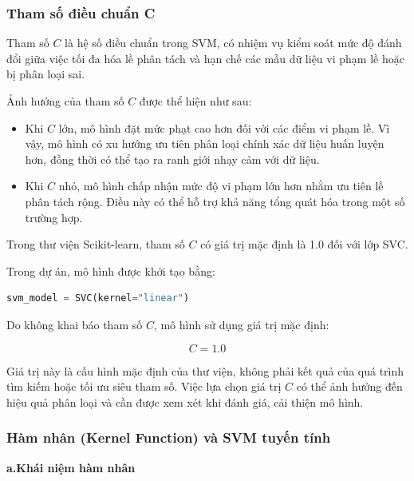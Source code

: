 \documentclass[14pt]{extarticle}
\begin{document}
		\subsubsection{Tham số điều chuẩn C}
		
		\noindent
		Tham số $C$ là hệ số điều chuẩn trong SVM, có nhiệm vụ kiểm soát mức độ đánh đổi giữa việc tối đa hóa lề phân tách và hạn chế các mẫu dữ liệu vi phạm lề hoặc bị phân loại sai.
		
		\noindent
		Ảnh hưởng của tham số $C$ được thể hiện như sau:
		
		\begin{itemize}
			\item Khi $C$ lớn, mô hình đặt mức phạt cao hơn đối với các điểm vi phạm lề. Vì vậy, mô hình có xu hướng ưu tiên phân loại chính xác dữ liệu huấn luyện hơn, đồng thời có thể tạo ra ranh giới nhạy cảm với dữ liệu.
			
			\item Khi $C$ nhỏ, mô hình chấp nhận mức độ vi phạm lớn hơn nhằm ưu tiên lề phân tách rộng. Điều này có thể hỗ trợ khả năng tổng quát hóa trong một số trường hợp.
		\end{itemize}
		
		\noindent
		Trong thư viện Scikit-learn, tham số $C$ có giá trị mặc định là 1.0 đối với lớp SVC.
		
		\noindent
		Trong dự án, mô hình được khởi tạo bằng:
		
		\begin{lstlisting}[language=Python]
			svm_model = SVC(kernel="linear")
		\end{lstlisting}
		
		\noindent
		Do không khai báo tham số $C$, mô hình sử dụng giá trị mặc định:
		
		\begin{equation*}
			C = 1.0
		\end{equation*}
		
		\noindent
		Giá trị này là cấu hình mặc định của thư viện, không phải kết quả của quá trình tìm kiếm hoặc tối ưu siêu tham số. Việc lựa chọn giá trị $C$ có thể ảnh hưởng đến hiệu quả phân loại và cần được xem xét khi đánh giá, cải thiện mô hình.
		\newpage
		
		\subsubsection{Hàm nhân (Kernel Function) và SVM tuyến tính}
		
	\textbf{a.Khái niệm hàm nhân}
		
\end{document}
